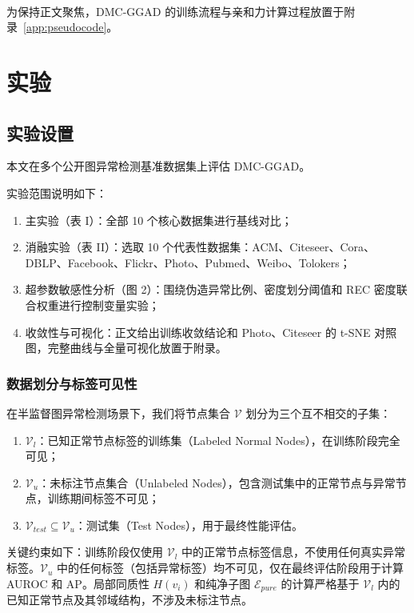 ﻿﻿﻿﻿    \documentclass[conference, onecolumn]{IEEEtran}
\begin{document}
    为保持正文聚焦，DMC-GGAD 的训练流程与亲和力计算过程放置于附录~\ref{app:pseudocode}。

    \section{实验}

    \subsection{实验设置}
    本文在多个公开图异常检测基准数据集上评估 DMC-GGAD。

    

    实验范围说明如下：
    \begin{enumerate}
        \item 主实验（表 I）：全部 10 个核心数据集进行基线对比；
        \item 消融实验（表 II）：选取 10 个代表性数据集：ACM、Citeseer、Cora、DBLP、Facebook、Flickr、Photo、Pubmed、Weibo、Tolokers；
        \item 超参数敏感性分析（图 2）：围绕伪造异常比例、密度划分阈值和 REC 密度联合权重进行控制变量实验；
        \item 收敛性与可视化：正文给出训练收敛结论和 Photo、Citeseer 的 t-SNE 对照图，完整曲线与全量可视化放置于附录。
    \end{enumerate}

    \subsubsection{数据划分与标签可见性}
    在半监督图异常检测场景下，我们将节点集合 $\mathcal{V}$ 划分为三个互不相交的子集：
    \begin{enumerate}
        \item $\mathcal{V}_l$：已知正常节点标签的训练集（Labeled Normal Nodes），在训练阶段完全可见；
        \item $\mathcal{V}_u$：未标注节点集合（Unlabeled Nodes），包含测试集中的正常节点与异常节点，训练期间标签不可见；
        \item $\mathcal{V}_{test} \subseteq \mathcal{V}_u$：测试集（Test Nodes），用于最终性能评估。
    \end{enumerate}
    
    关键约束如下：训练阶段仅使用 $\mathcal{V}_l$ 中的正常节点标签信息，不使用任何真实异常标签。$\mathcal{V}_u$ 中的任何标签（包括异常标签）均不可见，仅在最终评估阶段用于计算 AUROC 和 AP。局部同质性 $H(v_i)$ 和纯净子图 $\mathcal{E}_{pure}$ 的计算严格基于 $\mathcal{V}_l$ 内的已知正常节点及其邻域结构，不涉及未标注节点。
\end{document}

